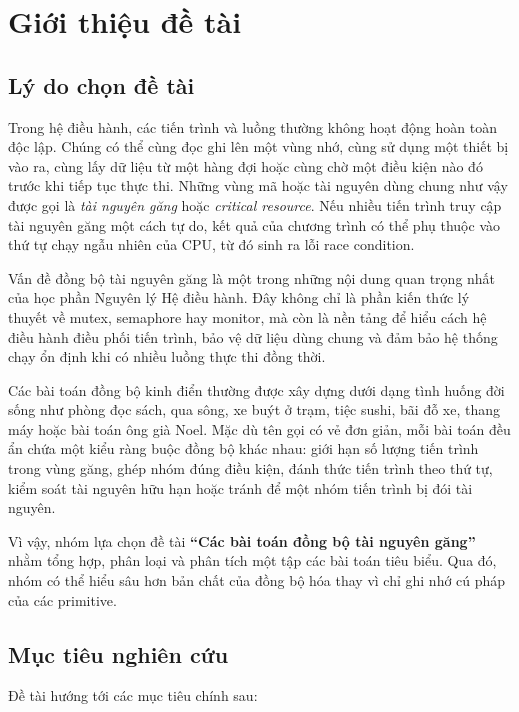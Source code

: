 \chapter{Giới thiệu đề tài}

\section{Lý do chọn đề tài}

Trong hệ điều hành, các tiến trình và luồng thường không hoạt động hoàn toàn độc lập. Chúng có thể cùng đọc ghi lên một vùng nhớ, cùng sử dụng một thiết bị vào ra, cùng lấy dữ liệu từ một hàng đợi hoặc cùng chờ một điều kiện nào đó trước khi tiếp tục thực thi. Những vùng mã hoặc tài nguyên dùng chung như vậy được gọi là \textit{tài nguyên găng} hoặc \textit{critical resource}. Nếu nhiều tiến trình truy cập tài nguyên găng một cách tự do, kết quả của chương trình có thể phụ thuộc vào thứ tự chạy ngẫu nhiên của CPU, từ đó sinh ra lỗi race condition.

Vấn đề đồng bộ tài nguyên găng là một trong những nội dung quan trọng nhất của học phần Nguyên lý Hệ điều hành. Đây không chỉ là phần kiến thức lý thuyết về mutex, semaphore hay monitor, mà còn là nền tảng để hiểu cách hệ điều hành điều phối tiến trình, bảo vệ dữ liệu dùng chung và đảm bảo hệ thống chạy ổn định khi có nhiều luồng thực thi đồng thời.

Các bài toán đồng bộ kinh điển thường được xây dựng dưới dạng tình huống đời sống như phòng đọc sách, qua sông, xe buýt ở trạm, tiệc sushi, bãi đỗ xe, thang máy hoặc bài toán ông già Noel. Mặc dù tên gọi có vẻ đơn giản, mỗi bài toán đều ẩn chứa một kiểu ràng buộc đồng bộ khác nhau: giới hạn số lượng tiến trình trong vùng găng, ghép nhóm đúng điều kiện, đánh thức tiến trình theo thứ tự, kiểm soát tài nguyên hữu hạn hoặc tránh để một nhóm tiến trình bị đói tài nguyên.

Vì vậy, nhóm lựa chọn đề tài \textbf{``Các bài toán đồng bộ tài nguyên găng''} nhằm tổng hợp, phân loại và phân tích một tập các bài toán tiêu biểu. Qua đó, nhóm có thể hiểu sâu hơn bản chất của đồng bộ hóa thay vì chỉ ghi nhớ cú pháp của các primitive.

\section{Mục tiêu nghiên cứu}

Đề tài hướng tới các mục tiêu chính sau:

